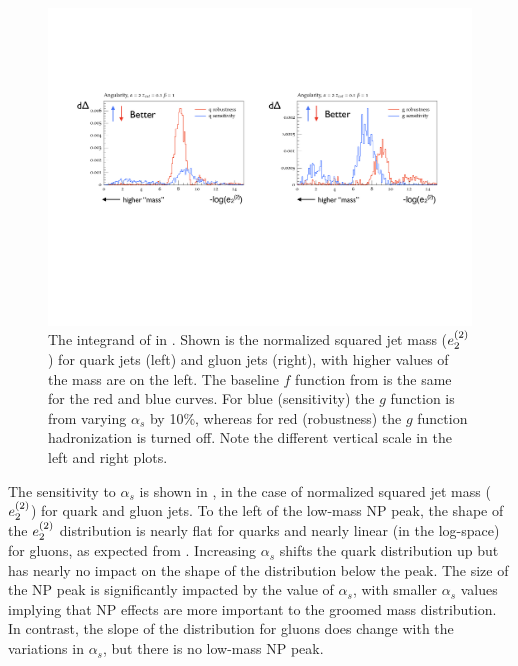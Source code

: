 \begin{figure}[t]
\begin{center}
\includegraphics[width = 0.99\columnwidth]{figures/differentialseparation2.pdf}
\end{center}
\caption{The integrand of  in \herwig.  Shown is the normalized squared jet mass ($e_{2}^{(2)}$)  for quark jets (left) and gluon jets (right), with higher values of the mass are on the left.  The baseline $f$ function from  is the same for the red and blue curves.  For blue (sensitivity) the $g$ function is from varying $\alpha_s$ by 10\%, whereas for red (robustness) the $g$ function hadronization is turned off.  Note the different vertical scale in the left and right plots. }
\label{fig:differentialseparation}
\end{figure}

The sensitivity to $\alpha_s$ is shown in , in the case of normalized squared jet mass ($e_{2}^{(2)}$) for quark and gluon jets.
%
To the left of the low-mass NP peak, the shape of the $e_{2}^{(2)}$ distribution is nearly flat for quarks and nearly linear (in the log-space) for gluons, as expected from .
%
Increasing $\alpha_s$ shifts the quark distribution up but has nearly no impact on the shape of the distribution below the peak.
%
The size of the NP peak is significantly impacted by the value of $\alpha_s$, with smaller $\alpha_s$ values implying that NP effects are more important to the groomed mass distribution.
%
In contrast, the slope of the distribution for gluons does change with the variations in $\alpha_s$, but there is no low-mass NP peak.

